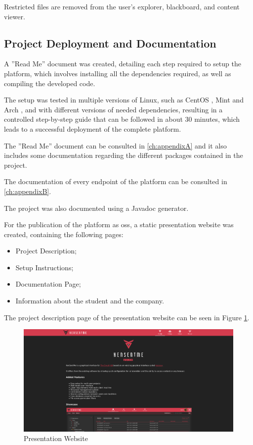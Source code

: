 Restricted files are removed from the user's explorer, blackboard, and content viewer.

\subsection{Project Deployment and Documentation}

A ''Read Me'' document was created, detailing each step required to setup the platform, which involves installing all the dependencies required, as well as compiling the developed code.

The setup was tested in multiple versions of Linux,  such as CentOS \cite{centos}, Mint \cite{mint} and Arch \cite{arch}, and with different versions of needed dependencies, 
resulting in a controlled step-by-step guide that can be followed in about 30 minutes, which leads to a successful deployment of the complete platform.

The ''Read Me'' document can be consulted in \autoref{ch:appendixA} and it also includes some documentation regarding the different packages contained in the project.

The documentation of every endpoint of the platform can be consulted in \autoref{ch:appendixB}.

The project was also documented using a Javadoc \cite{javadoc} generator.

For the publication of the platform as \acrshort{oss}, a static presentation website was created, containing the following pages:

\begin{itemize}
 \item Project Description;
 \item Setup Instructions;
 \item Documentation Page;
 \item Information about the student and the company.
\end{itemize}

The project description page of the presentation website can be seen in Figure \ref{fig:website}.

\begin{figure}[ht]
 \centering
 \includegraphics[width=1\linewidth]{imgs/website.png}
 \caption{Presentation Website}
 \label{fig:website}
\end{figure}

